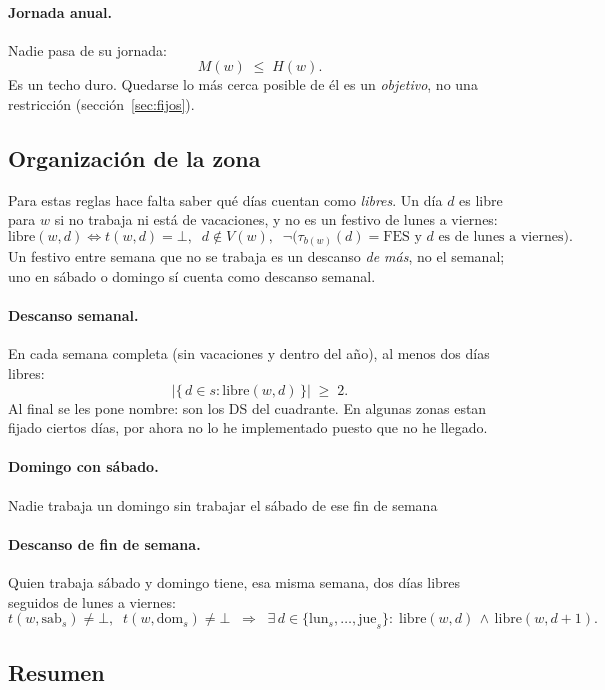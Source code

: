 \documentclass[11pt,a4paper]{article}
\begin{document}
\paragraph{Jornada anual.} Nadie pasa de su jornada:
\[
  M(w) \;\le\; H(w).
\]
Es un techo duro. Quedarse lo más cerca posible de él es un \emph{objetivo}, no una restricción
(sección~\ref{sec:fijos}).

\subsection{Organización de la zona}

Para estas reglas hace falta saber qué días cuentan como \emph{libres}. Un día $d$ es libre para
$w$ si no trabaja ni está de vacaciones, y no es un festivo de lunes a viernes:
\[
  \mathrm{libre}(w,d) \iff t(w,d) = \bot,\;\; d \notin V(w),\;\;
  \neg\bigl(\tau_{b(w)}(d) = \mathrm{FES} \text{ y } d \text{ es de lunes a viernes}\bigr).
\]
Un festivo entre semana que no se trabaja es un descanso \emph{de más}, no el semanal; uno en
sábado o domingo sí cuenta como descanso semanal.

\paragraph{Descanso semanal.} En cada semana completa (sin vacaciones y dentro del año), al menos
dos días libres:
\[
  \bigl|\{\, d \in s : \mathrm{libre}(w,d) \,\}\bigr| \;\ge\; 2 .
\]
Al final se les pone nombre: son los DS del cuadrante. En algunas zonas estan fijado ciertos días, por ahora
no lo he implementado puesto que no he llegado.

\paragraph{Domingo con sábado.} Nadie trabaja un domingo sin trabajar el sábado de ese fin de
semana

\paragraph{Descanso de fin de semana.} Quien trabaja sábado y domingo tiene, esa misma semana,
dos días libres seguidos de lunes a viernes:
\[
  t(w,\mathrm{sab}_s) \neq \bot,\;\; t(w,\mathrm{dom}_s) \neq \bot \;\;\Rightarrow\;\;
  \exists\, d \in \{\mathrm{lun}_s, \dots, \mathrm{jue}_s\} :\;
  \mathrm{libre}(w,d) \,\wedge\, \mathrm{libre}(w,d+1).
\]

\subsection{Resumen}
\end{document}
